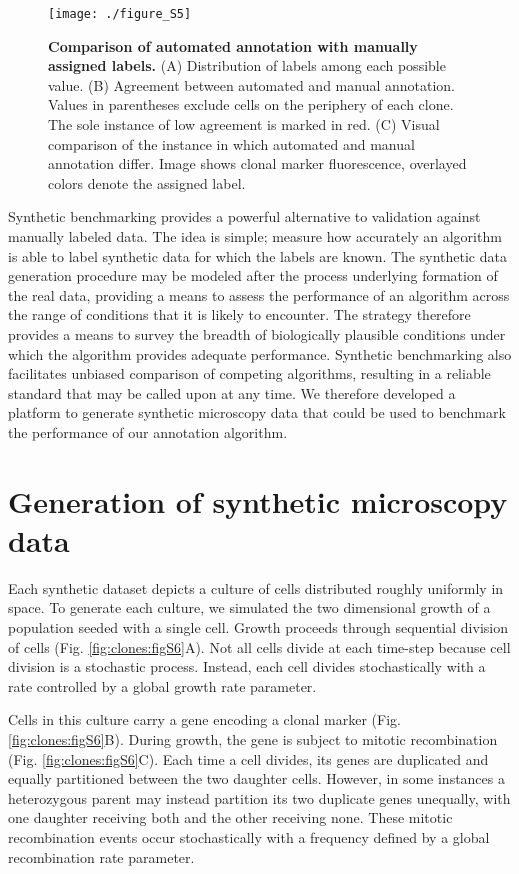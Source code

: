 \begin{figure}[h]
\texttt{[image: ./figure\_S5]}
\caption[Comparison of automated annotation with manually assigned labels.]{\textbf{Comparison of automated annotation with manually assigned labels.} (A) Distribution of labels among each possible value. (B) Agreement between automated and manual annotation. Values in parentheses exclude cells on the periphery of each clone. The sole instance of low agreement is marked in red. (C) Visual comparison of the instance in which automated and manual annotation differ. Image shows clonal marker fluorescence, overlayed colors denote the assigned label.}
\label{fig:clones:figS5}
\end{figure}

Synthetic benchmarking provides a powerful alternative to validation against manually labeled data. The idea is simple; measure how accurately an algorithm is able to label synthetic data for which the labels are known. The synthetic data generation procedure may be modeled after the process underlying formation of the real data, providing a means to assess the performance of an algorithm across the range of conditions that it is likely to encounter. The strategy therefore provides a means to survey the breadth of biologically plausible conditions under which the algorithm provides adequate performance. Synthetic benchmarking also facilitates unbiased comparison of competing algorithms, resulting in a reliable standard that may be called upon at any time. We therefore developed a platform to generate synthetic microscopy data that could be used to benchmark the performance of our annotation algorithm. 

\section{Generation of synthetic microscopy data}
\label{clones:data_generation}

Each synthetic dataset depicts a culture of cells distributed roughly uniformly in space. To generate each culture, we simulated the two dimensional growth of a population seeded with a single cell. Growth proceeds through sequential division of cells (Fig. \ref{fig:clones:figS6}A). Not all cells divide at each time-step because cell division is a stochastic process. Instead, each cell divides stochastically with a rate controlled by a global growth rate parameter.

Cells in this culture carry a gene encoding a clonal marker (Fig. \ref{fig:clones:figS6}B). During growth, the gene is subject to mitotic recombination (Fig. \ref{fig:clones:figS6}C). Each time a cell divides, its genes are duplicated and equally partitioned between the two daughter cells. However, in some instances a heterozygous parent may instead partition its two duplicate genes unequally, with one daughter receiving both and the other receiving none. These mitotic recombination events occur stochastically with a frequency defined by a global recombination rate parameter. 

